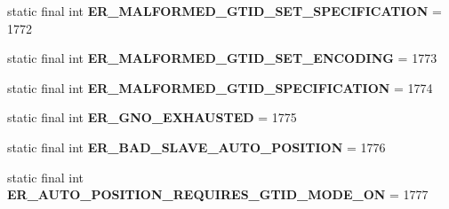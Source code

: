 \begin{DoxyCompactItemize}
\item 
\mbox{\label{classcom_1_1mysql_1_1cj_1_1exceptions_1_1_mysql_error_numbers_a703d085948f06f52957d765d97a7c3d3}} 
static final int {\bfseries E\+R\+\_\+\+M\+A\+L\+F\+O\+R\+M\+E\+D\+\_\+\+G\+T\+I\+D\+\_\+\+S\+E\+T\+\_\+\+S\+P\+E\+C\+I\+F\+I\+C\+A\+T\+I\+ON} = 1772
\item 
\mbox{\label{classcom_1_1mysql_1_1cj_1_1exceptions_1_1_mysql_error_numbers_a3c2e7b6a6818511629b8fe46dba8dee4}} 
static final int {\bfseries E\+R\+\_\+\+M\+A\+L\+F\+O\+R\+M\+E\+D\+\_\+\+G\+T\+I\+D\+\_\+\+S\+E\+T\+\_\+\+E\+N\+C\+O\+D\+I\+NG} = 1773
\item 
\mbox{\label{classcom_1_1mysql_1_1cj_1_1exceptions_1_1_mysql_error_numbers_a778b5cee9f8e3a0aa05007e22ef8284a}} 
static final int {\bfseries E\+R\+\_\+\+M\+A\+L\+F\+O\+R\+M\+E\+D\+\_\+\+G\+T\+I\+D\+\_\+\+S\+P\+E\+C\+I\+F\+I\+C\+A\+T\+I\+ON} = 1774
\item 
\mbox{\label{classcom_1_1mysql_1_1cj_1_1exceptions_1_1_mysql_error_numbers_a8a71e6c443a88bfb323244f62123b4c3}} 
static final int {\bfseries E\+R\+\_\+\+G\+N\+O\+\_\+\+E\+X\+H\+A\+U\+S\+T\+ED} = 1775
\item 
\mbox{\label{classcom_1_1mysql_1_1cj_1_1exceptions_1_1_mysql_error_numbers_a0393f6ba02b2b333d35c71bd8642398c}} 
static final int {\bfseries E\+R\+\_\+\+B\+A\+D\+\_\+\+S\+L\+A\+V\+E\+\_\+\+A\+U\+T\+O\+\_\+\+P\+O\+S\+I\+T\+I\+ON} = 1776
\item 
\mbox{\label{classcom_1_1mysql_1_1cj_1_1exceptions_1_1_mysql_error_numbers_ad9f97fba65fb214df5dbf865500bff51}} 
static final int {\bfseries E\+R\+\_\+\+A\+U\+T\+O\+\_\+\+P\+O\+S\+I\+T\+I\+O\+N\+\_\+\+R\+E\+Q\+U\+I\+R\+E\+S\+\_\+\+G\+T\+I\+D\+\_\+\+M\+O\+D\+E\+\_\+\+ON} = 1777
\item 
\mbox{\label{classcom_1_1mysql_1_1cj_1_1exceptions_1_1_mysql_error_numbers_a45655667582ea16dbbc8559e01b8e5ce}} 

\end{DoxyCompactItemize}
